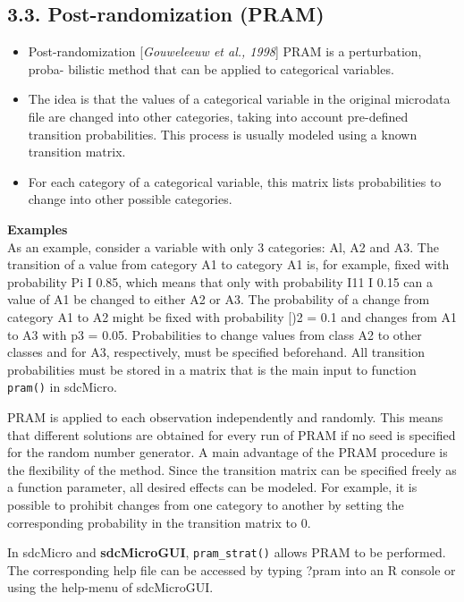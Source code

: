 \documentclass[]{article}
\begin{document}
\subsection*{3.3. Post-randomization (PRAM)}
\begin{itemize}
\item Post-randomization [\textit{Gouweleeuw et al., 1998}] PRAM is a perturbation, proba-
bilistic method that can be applied to categorical variables. 

\item The idea is that the values of a categorical variable in the original microdata ﬁle are changed into other categories, taking into account pre-deﬁned transition probabilities. This process is
usually modeled using a known transition matrix. 

\item For each category of a categorical variable, this matrix lists probabilities to change into other possible categories.
\end{itemize}



\textbf{Examples}\\
As an example, consider a variable with only 3 categories: Al, A2 and A3. The
transition of a value from category A1 to category A1 is, for example, ﬁxed with
probability Pi I 0.85, which means that only with probability I11 I 0.15 can a
value of A1 be changed to either A2 or A3. The probability of a change from
category A1 to A2 might be ﬁxed with probability [)2 = 0.1 and changes from A1
to A3 with p3 = 0.05. Probabilities to change values from class A2 to other classes
and for A3, respectively, must be speciﬁed beforehand. All transition probabilities
must be stored in a matrix that is the main input to function \texttt{pram()} in sdcMicro.

PRAM is applied to each observation independently and randomly. This means
that different solutions are obtained for every run of PRAM if no seed is speciﬁed
for the random number generator. A main advantage of the PRAM procedure is
the ﬂexibility of the method. Since the transition matrix can be speciﬁed freely as a
function parameter, all desired effects can be modeled. For example, it is possible
to prohibit changes from one category to another by setting the corresponding
probability in the transition matrix to 0.

In sdcMicro and \textbf{sdcMicroGUI}, \texttt{pram\_strat()} allows PRAM to be performed.
The corresponding help ﬁle can be accessed by typing ?pram into an R console
or using the help-menu of sdcMicroGUI. 
\end{document}
